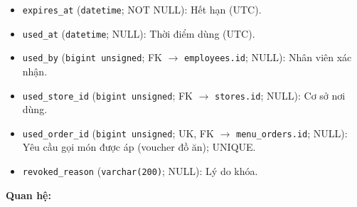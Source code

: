 \begin{itemize}
\item \texttt{expires\_at} (\texttt{datetime}; NOT NULL): Hết hạn (UTC).

\item \texttt{used\_at} (\texttt{datetime}; NULL): Thời điểm dùng (UTC).

\item \texttt{used\_by} (\texttt{bigint unsigned}; FK $\rightarrow$ \texttt{employees.id}; NULL): Nhân viên xác nhận.

\item \texttt{used\_store\_id} (\texttt{bigint unsigned}; FK $\rightarrow$ \texttt{stores.id}; NULL): Cơ sở nơi dùng.

\item \texttt{used\_order\_id} (\texttt{bigint unsigned}; UK, FK $\rightarrow$ \texttt{menu\_orders.id}; NULL): Yêu cầu gọi món được áp (voucher đồ ăn); UNIQUE.

\item \texttt{revoked\_reason} (\texttt{varchar(200)}; NULL): Lý do khóa.

\end{itemize}

\textbf{Quan hệ:}


